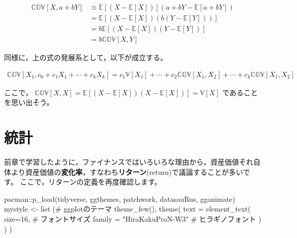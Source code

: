 \documentclass[
  letterpaper,
  pandoc,
  ja=standard,
  jafont = hiragino-pron]{ltjsbook}
\newenvironment{Shaded}{\begin{snugshade}}{\end{snugshade}}
\newcommand{\AttributeTok}[1]{\textcolor[rgb]{0.40,0.45,0.13}{#1}}
\newcommand{\CommentTok}[1]{\textcolor[rgb]{0.37,0.37,0.37}{#1}}
\newcommand{\DecValTok}[1]{\textcolor[rgb]{0.68,0.00,0.00}{#1}}
\newcommand{\FunctionTok}[1]{\textcolor[rgb]{0.28,0.35,0.67}{#1}}
\newcommand{\NormalTok}[1]{\textcolor[rgb]{0.00,0.23,0.31}{#1}}
\newcommand{\OtherTok}[1]{\textcolor[rgb]{0.00,0.23,0.31}{#1}}
\newcommand{\SpecialCharTok}[1]{\textcolor[rgb]{0.37,0.37,0.37}{#1}}
\newcommand{\StringTok}[1]{\textcolor[rgb]{0.13,0.47,0.30}{#1}}
\begin{document}
\[
\begin{aligned}
\mathbb{COV}[X, a + bY] & \equiv \mathbb{E}[(X - \mathbb{E}[X])](a+bY - \mathbb{E}[a + bY])\nonumber \\
                &= \mathbb{E}[(X - \mathbb{E}[X])(b(Y - \mathbb{E}[Y]))]\nonumber \\
                &= b \mathbb{E}[ (X - \mathbb{E}[X])(Y - \mathbb{E}[Y])]\nonumber \\
                &= b \mathbb{COV}[X,Y]
\end{aligned}
\]

同様に，上の式の発展系として，以下が成立する。

\[
\begin{aligned}
\mathbb{COV}[X_1, c_0 + c_1 X_1 + \cdots + c_k X_k] = c_1 \mathbb{V}[X_1] + \cdots + c_2\mathbb{COV}[X_1,X_2] + \cdots + c_k \mathbb{COV}[X_1,X_2]
\end{aligned}
\]

ここで，
\(\mathbb{COV}[X,X] = \mathbb{E}[ ( X - \mathbb{E}[X])(X- \mathbb{E}[X]) ] = \mathbb{V}[X]\)
であることを思い出そう。


\chapter{統計}\label{ux7d71ux8a08}

前章で学習したように，ファイナンスではいろいろな理由から，資産価値それ自体より資産価値の\textbf{変化率}，すなわち\textbf{リターン}(return)で議論することが多いです。
ここで，リターンの定義を再度確認します。

\begin{Shaded}
\begin{Highlighting}[]
\NormalTok{pacman}\SpecialCharTok{::}\FunctionTok{p\_load}\NormalTok{(tidyverse, ggthemes, patchwork, datasauRus, gganimate)}
\NormalTok{mystyle }\OtherTok{\textless{}{-}} \FunctionTok{list}\NormalTok{ (}\CommentTok{\#  ggplotのテーマ}
  \FunctionTok{theme\_few}\NormalTok{(),}
  \FunctionTok{theme}\NormalTok{(}
    \AttributeTok{text =} \FunctionTok{element\_text}\NormalTok{(}
      \AttributeTok{size=}\DecValTok{16}\NormalTok{,  }\CommentTok{\#  フォントサイズ}
     \AttributeTok{family =} \StringTok{"HiraKakuProN{-}W3"} \CommentTok{\# ヒラギノフォント}
\NormalTok{    )}
\NormalTok{  )}
\NormalTok{)}
\end{Highlighting}
\end{Shaded}
\end{document}
